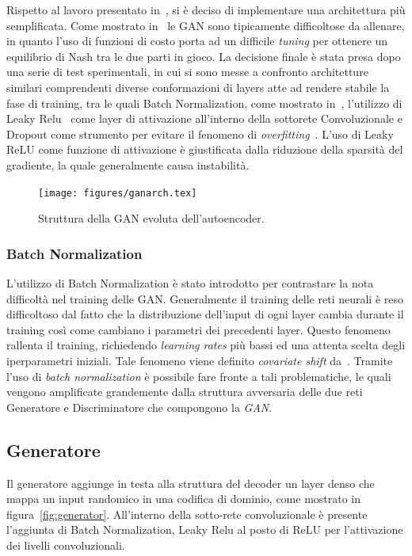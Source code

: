 Rispetto al lavoro presentato in~\cite{deepdga}, si è deciso di implementare una architettura più semplificata. Come mostrato in~\cite{1606.03498} le GAN sono tipicamente difficoltose da allenare, in quanto l'uso di funzioni di costo porta ad un difficile \textit{tuning} per ottenere un equilibrio di Nash tra le due parti in gioco. La decisione finale è stata presa dopo una serie di test sperimentali, in cui si sono messe a confronto architetture similari comprendenti diverse conformazioni di layers atte ad rendere stabile la fase di training, tra le quali Batch Normalization, come mostrato in~\cite{1502.03167},  l'utilizzo di Leaky Relu~\cite{GANhacks} come layer di attivazione all'interno della sottorete Convoluzionale e Dropout come strumento per evitare il fenomeno di \textit{overfitting}~\cite{dropout}. L'uso di Leaky ReLU come funzione di attivazione è giustificata dalla riduzione della sparsità del gradiente, la quale generalmente causa instabilità.

\begin{figure}[!p]
    \centering
	\texttt{[image: figures/ganarch.tex]}
	\caption{Struttura della GAN evoluta dell'autoencoder.
\label{fig:archgan}}
\end{figure}

\subsubsection{Batch Normalization}
L'utilizzo di Batch Normalization è stato introdotto per contrastare la nota difficoltà nel training delle GAN. Generalmente il training delle reti neurali è reso difficoltoso dal fatto che la distribuzione dell'input di ogni layer cambia durante il training così come cambiano i parametri dei precedenti layer. Questo fenomeno rallenta il training, richiedendo \textit{learning rates} più bassi ed una attenta scelta degli iperparametri iniziali. Tale fenomeno viene definito \textit{covariate shift} da~\cite{1502.03167}. Tramite l'uso di \textit{batch normalization} è possibile fare fronte a tali problematiche, le quali vengono amplificate grandemente dalla struttura avversaria delle due reti Generatore e Discriminatore che compongono la \textit{GAN}. 

\subsection{Generatore}
\label{generator}
Il generatore aggiunge in testa alla struttura del decoder un layer denso che mappa un input randomico in una codifica di dominio, come mostrato in figura~\ref{fig:generator}. All'interno della sotto-rete convoluzionale è presente l'aggiunta di Batch Normalization, Leaky Relu al posto di ReLU per l'attivazione dei livelli convoluzionali.

